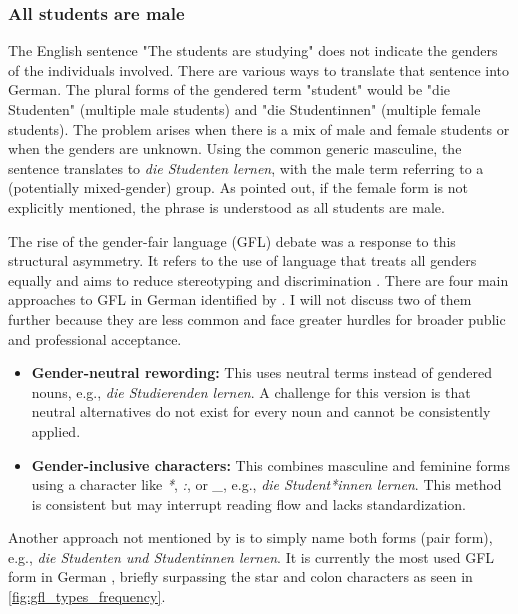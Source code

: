 \subsubsection{All students are male}
The English sentence "The students are studying" does not indicate the genders of the individuals involved. There are various ways to translate that sentence into German. The plural forms of the gendered term "student" would be "die Studenten" (multiple male students) and "die Studentinnen" (multiple female students). The problem arises when there is a mix of male and female students or when the genders are unknown. 
Using the common generic masculine, the sentence translates to \textit{die Studenten lernen}, with the male term referring to a (potentially mixed-gender) group. As \citet{schmitzGermanAllProfessors2022} pointed out, if the female form is not explicitly mentioned, the phrase is understood as all students are male.

The rise of the gender-fair language (GFL) debate was a response to this structural asymmetry. It refers to the use of language that treats all genders equally and aims to reduce stereotyping and discrimination \citep{sczesnyCanGenderFairLanguage2016}. 
There are four main approaches to GFL in German identified by \citet{lardelliBuildingBridgesDataset2024}. I will not discuss two of them further because they are less common and face greater hurdles for broader public and professional acceptance.

\begin{itemize}
    \item \textbf{Gender-neutral rewording:}  
    This uses neutral terms instead of gendered nouns, e.g., \textit{die Studierenden lernen}. A challenge for this version is that neutral alternatives do not exist for every noun and cannot be consistently applied.

    \item \textbf{Gender-inclusive characters:}  
    This combines masculine and feminine forms using a character like \textit{*}, \textit{:}, or \textit{\_}, e.g., \textit{die Student*innen lernen}. This method is consistent but may interrupt reading flow and lacks standardization.
\end{itemize}

\noindent Another approach not mentioned by \citeauthor{lardelliBuildingBridgesDataset2024} is to simply name both forms (pair form), e.g., \textit{die Studenten und Studentinnen lernen}. It is currently the most used GFL form in German \citep{waldendorfWordsChangeIncrease2024}, briefly surpassing the star and colon characters as seen in \autoref{fig:gfl_types_frequency}.

